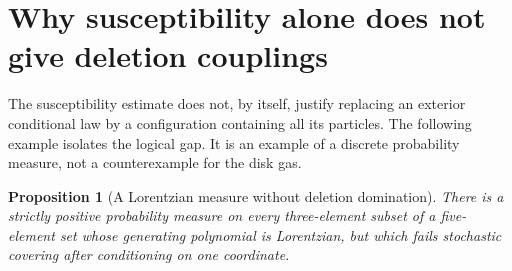 \documentclass[11pt]{article}
\newtheorem{proposition}[theorem]{Proposition}
\theoremstyle{remark}\newtheorem{remark}[theorem]{Remark}
\begin{document}


\section{Why susceptibility alone does not give deletion couplings}
\label{sec:lorentzian-covering-obstruction}

The susceptibility estimate does not, by itself, justify replacing an
exterior conditional law by a configuration containing all its particles.
The following example isolates the logical gap.  It is an example of a
discrete probability measure, not a counterexample for the disk gas.

\begin{proposition}[A Lorentzian measure without deletion domination]
\label{prop:lorentzian-no-covering}
There is a strictly positive probability measure on every three-element
subset of a five-element set whose generating polynomial is Lorentzian,
but which fails stochastic covering after conditioning on one coordinate.
\end{proposition}
\end{document}
